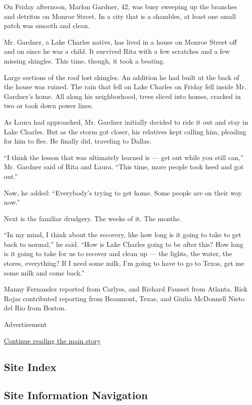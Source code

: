 On Friday afternoon, Marlon Gardner, 42, was busy sweeping up the
branches and detritus on Monroe Street. In a city that is a shambles, at
least one small patch was smooth and clean.

Mr. Gardner, a Lake Charles native, has lived in a house on Monroe
Street off and on since he was a child. It survived Rita with a few
scratches and a few missing shingles. This time, though, it took a
beating.

Large sections of the roof lost shingles. An addition he had built at
the back of the house was ruined. The rain that fell on Lake Charles on
Friday fell inside Mr. Gardner's home. All along his neighborhood, trees
sliced into homes, cracked in two or took down power lines.

As Laura had approached, Mr. Gardner initially decided to ride it out
and stay in Lake Charles. But as the storm got closer, his relatives
kept calling him, pleading for him to flee. He finally did, traveling to
Dallas.

``I think the lesson that was ultimately learned is --- get out while
you still can,'' Mr. Gardner said of Rita and Laura. ``This time, more
people took heed and got out.''

Now, he added: ``Everybody's trying to get home. Some people are on
their way now.''

Next is the familiar drudgery. The weeks of it. The months.

``In my mind, I think about the recovery, like how long is it going to
take to get back to normal,'' he said. ``How is Lake Charles going to be
after this? How long is it going to take for us to recover and clean up
--- the lights, the water, the stores, everything? If I need some milk,
I'm going to have to go to Texas, get me some milk and come back.''

Manny Fernandez reported from Carlyss, and Richard Fausset from Atlanta.
Rick Rojas contributed reporting from Beaumont, Texas, and Giulia
McDonnell Nieto del Rio from Boston.

Advertisement

\protect\hyperlink{after-bottom}{Continue reading the main story}

\hypertarget{site-index}{%
\subsection{Site Index}\label{site-index}}

\hypertarget{site-information-navigation}{%
\subsection{Site Information
Navigation}\label{site-information-navigation}}

